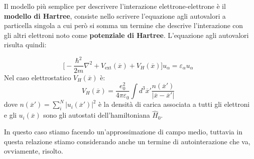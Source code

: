 Il modello più semplice per descrivere l'interazione elettrone-elettrone è il \textbf{modello di Hartree}, consiste nello scrivere l'equazione agli autovalori a particella singola a cui però si somma un termine che descrive l'interazione con gli altri elettroni noto come \textbf{potenziale di Hartree}. L'equazione agli autovalori risulta quindi:

\begin{equation*}
    \bigg[-\frac{\hbar^2}{2m}\nabla^2 + V_{\text{ext}}(\overline x) + V_H(\overline x)\bigg]u_\alpha=\varepsilon_\alpha u_\alpha
\end{equation*}
Nel caso elettrostatico $V_H(\overline x)$ è:
\begin{equation*}
    V_H(\overline x) = \frac{e_0^2}{4\pi\varepsilon_0}\int d^3\overline{x}' \frac{n(\overline{x}')}{|\overline x - \overline{x}'|}
\end{equation*}
dove $n(\overline{x}')=\sum_i^N|u_i(\overline{x}')|^2$ è la densità di carica associata a tutti gli elettroni e gli $u_i(\overline x)$ sono gli autostati dell'hamiltoniana $\hat H_0$.

In questo caso stiamo facendo un'approssimazione di campo medio, tuttavia in questa relazione stiamo considerando anche un termine di autointerazione che va, ovviamente, risolto.

